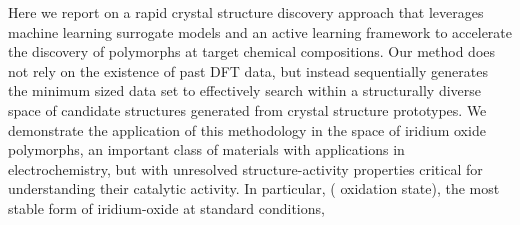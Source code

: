 %
Here we report on a rapid crystal structure discovery approach that leverages machine learning surrogate models and an active learning framework to accelerate the discovery of polymorphs at target chemical compositions.
%
Our method does not rely on the existence of past DFT data,
but instead sequentially generates the minimum sized data set to effectively search within a structurally diverse space of candidate structures generated from crystal structure prototypes.
%
%
%
%
%
%
%
We demonstrate the application of this methodology in the space of iridium oxide polymorphs,
an important class of materials with applications in electrochemistry,
but with unresolved structure-activity properties critical for understanding their catalytic activity.
%
In particular, \rIrOtwo ( oxidation state), the most stable form of iridium-oxide at standard conditions,
